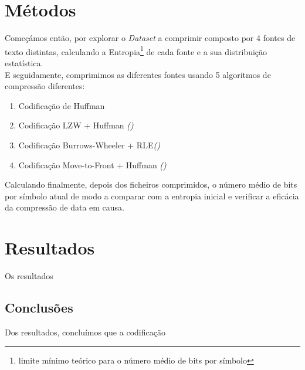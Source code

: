 \documentclass[11pt,journal,compsoc]{IEEEtran}
\begin{document}
    
    \section{Métodos}\label{sec:metodos}
    Começámos então, por explorar o \textit{Dataset} a comprimir composto por 4 fontes de texto distintas, calculando a Entropia\footnote{limite mínimo teórico para o número médio de bits por símbolo} de cada fonte e a sua distribuição estatística.\\
    E seguidamente, comprimimos as diferentes fontes usando 5 algoritmos de compressão diferentes:
    
    \begin{enumerate}
        \item Codificação de Huffman
        \item Codificação LZW + Huffman \textit{()}
        \item Codificação Burrows-Wheeler + RLE\textit{()}
        \item Codificação Move-to-Front + Huffman \textit{()}
    \end{enumerate}
    
    
    Calculando finalmente, depois dos ficheiros comprimidos, o número médio de bits por símbolo atual de modo a comparar com a entropia inicial e verificar a eficácia da compressão de data em causa.
    
    \section{Resultados} %
    Os resultados 
    
    
    
    \subsection{Conclusões}
    Dos resultados, concluímos que a codificação
    
\end{document}
